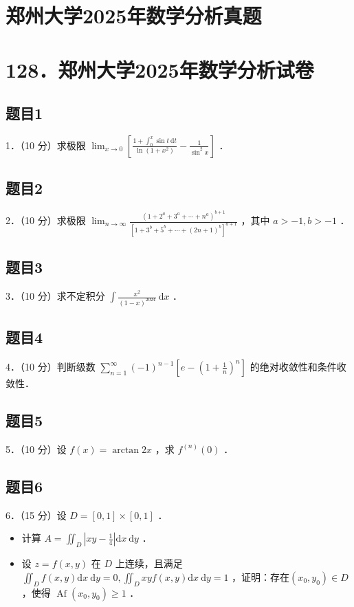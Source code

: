 \documentclass{article}
\begin{document}
\section*{郑州大学2025年数学分析真题}
\section*{128．郑州大学2025年数学分析试卷}

\subsection{题目1}
1．（10 分）求极限 \(\lim _{x \rightarrow 0}\left[\frac{1+\int_{0}^{x} \sin t \mathrm{~d} t}{\ln \left(1+x^{2}\right)}-\frac{1}{\sin ^{2} x}\right]\) ．

\subsection{题目2}
2．（10 分）求极限 \(\lim _{n \rightarrow \infty} \frac{\left(1+2^{a}+3^{a}+\cdots+n^{a}\right)^{b+1}}{\left[1+3^{b}+5^{b}+\cdots+(2 n+1)^{b}\right]^{a+1}}\) ，其中 \(a>-1, b>-1\) ．

\subsection{题目3}
3．（10 分）求不定积分 \(\int \frac{x^{2}}{(1-x)^{2024}} \mathrm{~d} x\) ．

\subsection{题目4}
4．（10 分）判断级数 \(\sum_{n=1}^{\infty}(-1)^{n-1}\left[e-\left(1+\frac{1}{n}\right)^{n}\right]\) 的绝对收敛性和条件收敛性．

\subsection{题目5}
5．（10 分）设 \(f(x)=\arctan 2 x\) ，求 \(f^{(n)}(0)\) ．

\subsection{题目6}
6．（15 分）设 \(D=[0,1] \times[0,1]\) ．

\begin{itemize}
  \item[（1）] 计算 \(A=\iint_{D}\left|x y-\frac{1}{4}\right| \mathrm{d} x \mathrm{~d} y\) ．
  \item[（2）] 设 \(z=f(x, y)\) 在 \(D\) 上连续，且满足 \(\iint_{D} f(x, y) \mathrm{d} x \mathrm{~d} y=0, \iint_{D} x y f(x, y) \mathrm{d} x \mathrm{~d} y=1\) ，证明：存在\(\left(x_{0}, y_{0}\right) \in D\) ，使得 \(\operatorname{Af}\left(x_{0}, y_{0}\right) \geq 1\) ．
\end{itemize}
\end{document}
